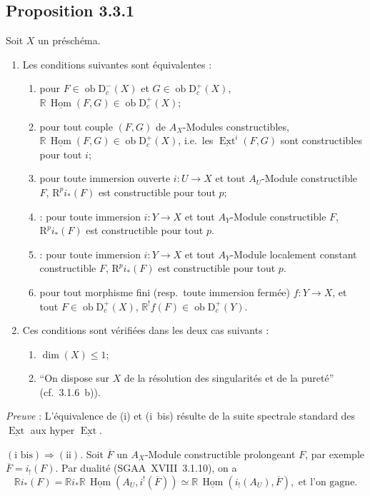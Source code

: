 \documentclass[11pt]{article}
\DeclareMathOperator{\Hom}{Hom}
\DeclareMathOperator{\Ext}{Ext}
\newcommand{\R}{\mathbb{R}}\newcommand{\RHomCore}{\mathbb{R}\mathrm{Hom}}
\newcommand{\D}{\mathrm{D}}
\newcommand{\ob}{\operatorname{ob}}
\newcommand{\ol}[1]{\overline{#1}}
\providecommand{\Hom}{\operatorname{Hom}}
\providecommand{\ob}{\operatorname{ob}}
\providecommand{\R}{\mathrm R}
\providecommand{\Hom}{\operatorname{Hom}}
\begin{document}
\subsection*{Proposition 3.3.1}
Soit $X$ un préschéma.
\begin{enumerate}
\item[a)] Les conditions suivantes sont équivalentes :
\begin{enumerate}
\item[(i)] pour $F \in \ob \D_c^{-}(X)$ et $G \in \ob \D_c^{+}(X)$, $\R\,\underline{\Hom}(F,G) \in \ob \D_c^{+}(X)$;
\item[(i~bis)] pour tout couple $(F,G)$ de $A_X$-Modules constructibles, $\R\,\underline{\Hom}(F,G) \in \ob \D_c^{+}(X)$, i.e.~les $\underline{\Ext}^i(F,G)$ sont constructibles pour tout $i$;
\item[(ii)] pour
toute immersion ouverte $i : U \to X$ et tout $A_U$-Module constructible $F$, $\mathrm{R}^p i_{*}(F)$ est constructible pour tout $p$;
\item[(ii~bis)] : pour toute immersion $i : Y \to X$ et tout $A_Y$-Module constructible $F$, $\mathrm{R}^p i_{*}(F)$ est constructible pour tout $p$.
\item[(ii~ter)] : pour toute immersion $i : Y \to X$ et tout $A_Y$-Module localement constant constructible $F$, $\mathrm{R}^p i_{*}(F)$ est constructible pour tout $p$.
\item[(iii)] pour tout morphisme fini (resp.~toute immersion fermée) $f : Y \to X$, et tout $F \in \ob \D_c^{+}(X)$, $\R^{!}f(F) \in \ob \D_c^{+}(Y)$.
\end{enumerate}
\item[b)] Ces conditions sont vérifiées dans les deux cas suivants :
\begin{enumerate}
\item[(i)] $\dim(X) \leqslant 1$;
\item[(ii)] ``On dispose sur $X$ de la résolution des singularités et de la pureté'' (cf.~3.1.6~b)).
\end{enumerate}
\end{enumerate}

\emph{Preuve} : L'équivalence de (i) et (i~bis) résulte de la suite spectrale standard des $\underline{\Ext}$ aux hyper $\underline{\Ext}$.

$(\text{i~bis}) \Rightarrow (\text{ii})$. Soit $\ol{F}$ un $A_X$-Module constructible prolongeant $F$, par exemple $\ol{F} = i_{!}(F)$. Par dualité (SGAA~XVIII~3.1.10), on a
\[
\R i_{*}(F) = \R i_{*} \R\,\underline{\Hom}(A_U, i^{!}(\ol{F})) \simeq \R\,\underline{\Hom}(i_{!}(A_U), \ol{F}), \text{ et l'on gagne.}
\]
\end{document}
